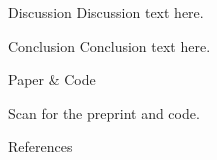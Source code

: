 \documentclass[final]{beamer}
\begin{document}
\begin{frame}[t]
\begin{postercolumns}
\begin{column}{\colwidth}
    \begin{block}{Discussion}
      Discussion text here.
    \end{block}

    \begin{block}{Conclusion}
      Conclusion text here.
    \end{block}

    \begin{exampleblock}{Paper \& Code}
      \begin{minipage}[c]{0.68\linewidth}
        Scan for the preprint and code.
      \end{minipage}\hfill
      \begin{minipage}[c]{0.28\linewidth}
        \raggedleft{}
      \end{minipage}
    \end{exampleblock}

    \begin{exampleblock}{References}
      \footnotesize
      
      
    \end{exampleblock}

  \end{column}

\end{postercolumns}
\end{frame}
\end{document}
